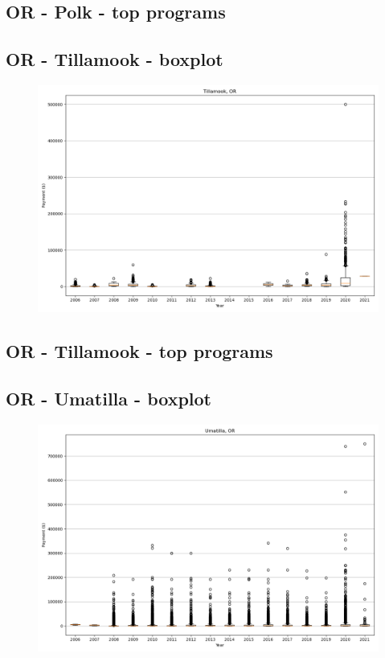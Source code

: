\subsection*{OR - Polk - top programs}

\newpage
\subsection*{OR - Tillamook - boxplot}
\begin{figure}[h]
\centering
\includegraphics[width=7in]{../output/boxplots/counties/Tillamook-OR_boxplot.png}
\end{figure}


\subsection*{OR - Tillamook - top programs}

\newpage
\subsection*{OR - Umatilla - boxplot}
\begin{figure}[h]
\centering
\includegraphics[width=7in]{../output/boxplots/counties/Umatilla-OR_boxplot.png}
\end{figure}


